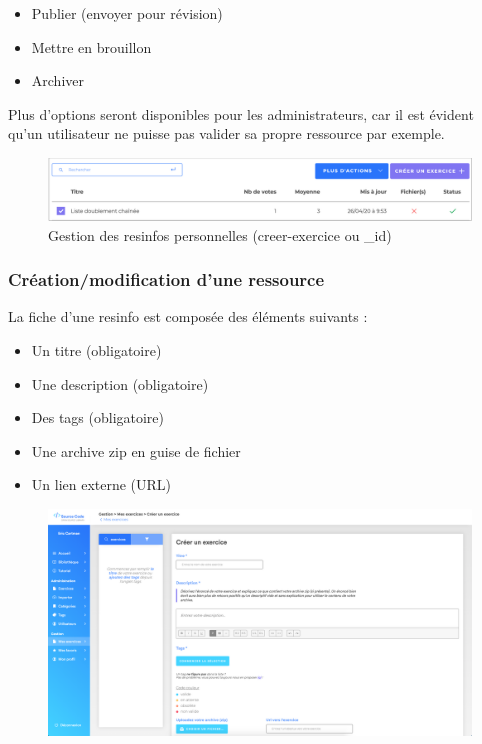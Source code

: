 \begin{itemize}
    \item Publier (envoyer pour révision)
    \item Mettre en brouillon
    \item Archiver
\end{itemize}

Plus d'options seront disponibles pour les administrateurs, car il est évident qu'un utilisateur ne puisse pas valider sa propre ressource par exemple.

\begin{figure}[H]
    \includegraphics[width=\textwidth,height=\textheight,keepaspectratio]{images/client/gestion-options.png}
    \caption[SourceCode : créer une \gls{resinfo}]{Gestion des \glspl{resinfo} personnelles (creer-exercice ou \_id)}
    \centering
\end{figure}

\subsubsection{Création/modification d'une ressource}

La fiche d'une \gls{resinfo} est composée des éléments suivants :

\begin{itemize}
    \item Un titre (obligatoire)
    \item Une description (obligatoire)
    \item Des \glspl{tag} (obligatoire)
    \item Une archive zip en guise de fichier
    \item Un lien externe (URL)
\end{itemize}

\begin{figure}[H]
    \includegraphics[width=\textwidth,height=\textheight,keepaspectratio]{images/client/create-exercise.png}
    \centering
\end{figure}

